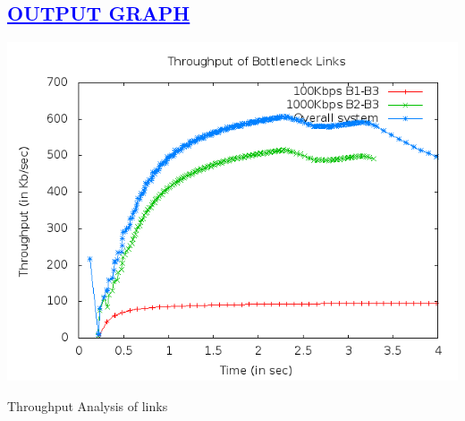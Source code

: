 \documentclass[a4paper,12pt]{report}
\begin{document}
\begin{center}
\chapter{\textcolor{blue}{\underline {OUTPUT GRAPH}}}

 \includegraphics[width=15 cm,height=15 cm]{./link_throughput.png}
 
Throughput Analysis of links
\end{center}
\end{document}
